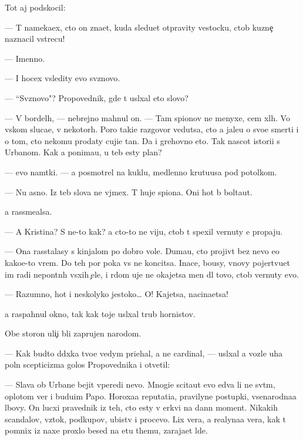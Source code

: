 \documentclass[10pt]{book}
\begin{document}
Tot aj podskocil:

— T{\yi} nameka{\y}ex, cto on zna{\y}et, kuda sledu{\y}et otpravity vestocku, ctob{\yi} kuzne{\c} naznacil vstrecu!

— Imenno.

— I hocex v{\yi}sledity {\y}evo sv{\ia}znovo.

— ``Sv{\ia}znovo"? Propovednik, gde t{\yi} usl{\yi}xal eto slovo?

— V bordel{\ia}h, — nebrejno mahnul on. — Tam spionov ne menyxe, cem xl{\io}h. Vo vs{\ia}kom sluca{\y}e, v nekotor{\yi}h. Poro{\y} taki{\y}e razgovor{\yi} vedutsa, cto {\y}a jale{\y}u o svo{\y}e{\y} smerti i o tom, cto nekomu prodaty cuji{\y}e ta{\y}n{\yi}. Da i grehovno eto. Tak nascot istori{\y}i s Urbanom. Kak {\y}a ponima{\y}u, u teb{\ia} {\y}esty plan?

— {\Y}evo nam{\e}tki. — {\Y}a posmotrel na kuklu, medlenno krut{\ia}{\x}u{\y}usa pod potolkom.

— Nu {\y}asno. Iz teb{\ia} slova ne v{\yi}jmex. T{\yi} huje spiona. Oni hot{\ia} b{\yi} bolta{\y}ut.

{\Y}a rassme{\y}alsa.

— A Kristina? S ne{\y}-to kak? {\Y}a cto-to ne viju, ctob{\yi} t{\yi} spexil vernuty {\y}e{\y} propaju.

— Ona rasstalasy s kinjalom po dobro{\y} vole. Duma{\y}u, cto projiv{\e}t bez nevo {\y}e{\x}o kako{\y}e-to vrem{\ia}. Do teh por poka vs{\e} ne koncitsa. Inace, bo{\y}usy, vnovy pojertvu{\y}et im radi nepon{\ia}tn{\yi}h v{\yi}sxih {\c}ele{\y}, i r{\ia}dom uje ne okajetsa men{\ia} dl{\ia} tovo, ctob{\yi} vernuty {\y}evo.

— Razumno, hot{\ia} i neskolyko jestoko… O! Kajetsa, nacina{\y}etsa!

{\Y}a raspahnul okno, tak kak toje usl{\yi}xal trub{\yi} hornistov.

Obe storon{\yi} uli{\c}i b{\yi}li zaprujen{\yi} narodom.

— Kak budto d{\ia}d{\io}xka tvo{\y}e{\y} vedym{\yi} pri{\y}ehal, a ne cardinal, — usl{\yi}xal {\y}a vozle uha poln{\yi}{\y} scepticizma golos Propovednika i otvetil:

— Slava ob Urbane bejit vperedi nevo. Mnogi{\y}e scita{\y}ut {\y}evo {\y}edva li ne sv{\ia}t{\yi}m, oplotom ver{\yi} i budu{\x}im Papo{\y}. Horoxa{\y}a reputati{\y}a, pravilyn{\yi}{\y}e postupki, vsenarodna{\y}a l{\io}bovy. On lucxi{\y} pravednik iz teh, cto {\y}esty v {\C}erkvi na dann{\yi}{\y} moment. Nikakih scandalov, vz{\ia}tok, podkupov, ubi{\y}stv i procevo. Lix vera, a realyna{\y}a vera, kak t{\yi} pomnix iz naxe{\y} proxlo{\y} besed{\yi} na etu themu, zaraja{\y}et l{\io}de{\y}.
\end{document}
